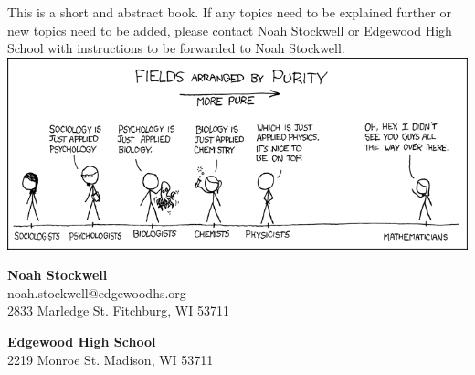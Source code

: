 This is a short and abstract book. If any topics need to be explained further or new topics need to be added, please contact Noah Stockwell or Edgewood High School with instructions to be forwarded to Noah Stockwell.
\vfill
\includegraphics[width=\textwidth]{purity.png}
\vspace{.25in}
\par \textbf{Noah Stockwell}\\
noah.stockwell@edgewoodhs.org\\
2833 Marledge St. Fitchburg, WI 53711\\
\par \textbf{Edgewood High School}\\
2219 Monroe St. Madison, WI 53711
